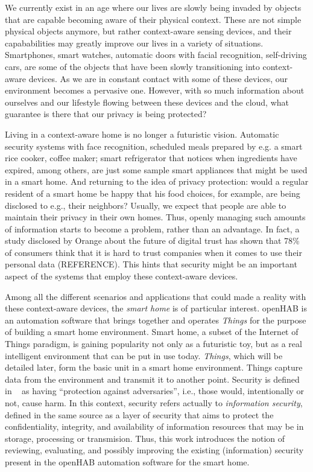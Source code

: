 \documentclass[12pt]{article}
\newcommand{\TODO}{\todo[inline]}
\begin{document}
\TODO{(ref) references}

We currently exist in an age where our lives are slowly being invaded by objects that are capable becoming aware of their physical context. These are not simple physical objects anymore, but rather context-aware sensing devices, and their capababilities may greatly improve our lives in a variety of situations. Smartphones, smart watches, automatic doors with facial recognition, self-driving cars, are some of the objects that have been slowly transitioning into context-aware devices. As we are in constant contact with some of these devices, our environment becomes a pervasive one. However, with so much information about ourselves and our lifestyle flowing between these devices and the cloud, what guarantee is there that our privacy is being protected?

Living in a context-aware home is no longer a futuristic vision. Automatic security systems with face recognition, scheduled meals prepared by e.g. a smart rice cooker, coffee maker; smart refrigerator that notices when ingredients have expired, among others, are just some sample smart appliances that might be used in a smart home. And returning to the idea of privacy protection: would a regular resident of a smart home be happy that his food choices, for example, are being disclosed to e.g., their neighbors? Usually, we expect that people are able to maintain their privacy in their own homes. Thus, openly managing such amounts of information starts to become a problem, rather than an advantage. In fact, a study disclosed by Orange about the future of digital trust has shown that 78\% of consumers think that it is hard to trust companies when it comes to use their personal data (REFERENCE). This hints that security might be an important aspect of the systems that employ these context-aware devices. 

Among all the different scenarios and applications that could made a reality with these context-aware devices, the \emph{smart home} is of particular interest. openHAB is an automation software that brings together and operates \emph{Things} for the purpose of building a smart home environment. Smart home, a subset of the Internet of Things paradigm, is gaining popularity not only as a futuristic toy, but as a real intelligent environment that can be put in use today. \emph{Things}, which will be detailed later, form the basic unit in a smart home environment. Things capture data from the environment and transmit it to another point. Security is defined in ~\cite{whitman2011principles} as having ``protection against adversaries'', i.e., those would, intentionally or not, cause harm. In this context, security refers actually to \emph{information security}, defined in the same source as a layer of security that aims to protect the confidentiality, integrity, and availability of information resources that may be in storage, processing or transmision. Thus, this work introduces the notion of reviewing, evaluating, and possibly improving the existing (information) security present in the openHAB automation software for the smart home.
\end{document}
